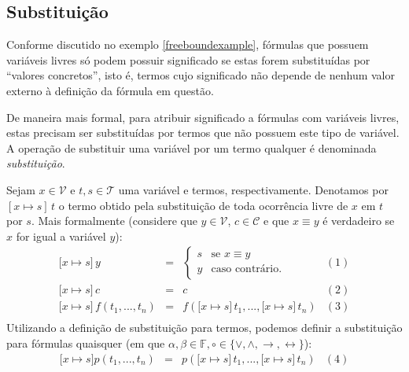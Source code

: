 \subsection{Substituição}

Conforme discutido no exemplo \ref{freeboundexample}, fórmulas que
possuem variáveis livres só podem possuir significado se estas
forem substituídas por ``valores concretos'', isto é, termos
cujo significado não depende de nenhum valor externo à definição da
fórmula em questão.

De maneira mais formal, para atribuir significado a fórmulas com
variáveis livres, estas precisam ser substituídas por termos que não
possuem este tipo de variável. A operação de substituir uma variável
por um termo qualquer é denominada \textit{substituição}.

\begin{Definition}[Substituição]
Sejam $x\in\mathcal{V}$ e $t,s\in\mathcal{T}$ uma variável e termos,
respectivamente. Denotamos por $[x\mapsto s]\,t$ o termo obtido pela
substituição de toda ocorrência livre de $x$ em $t$ por $s$. Mais
formalmente (considere que $y\in\mathcal{V}$, $c\in\mathcal{C}$ e que
$x \equiv y$ é verdadeiro se $x$ for igual a variável $y$):
\begin{equation*}
\begin{array}{lclc}
\lbrack x\mapsto s\rbrack \, y & = & \left\{
                                         \begin{array}{ll}
                                           s & \text{se } x \equiv y\\
                                           y & \text{caso contrário}.
                                         \end{array}
                                     \right . & (1)\\
\lbrack x\mapsto s\rbrack\,c & = & c & (2)\\
\lbrack x\mapsto s\rbrack\,f(t_1,...,t_n) & = & f(\lbrack x\mapsto s\rbrack\,t_1,...,
\lbrack x\mapsto s\rbrack\,t_n)  & (3) \\
\end{array}
\end{equation*}
Utilizando a definição de substituição para termos, podemos definir a
substituição para fórmulas quaisquer (em que $\alpha,\beta
\in\mathbb{F}, \circ\in\{\lor,\land,\to,\leftrightarrow\}$):
\[
\begin{array}{lclc}
\lbrack x \mapsto s\rbrack p(t_1,...,t_n) & = & p(\lbrack x \mapsto
s\rbrack\,t_1,...,\lbrack x \mapsto s\rbrack\,t_n)  & (4)\\

\end{array}\]
\end{Definition}
